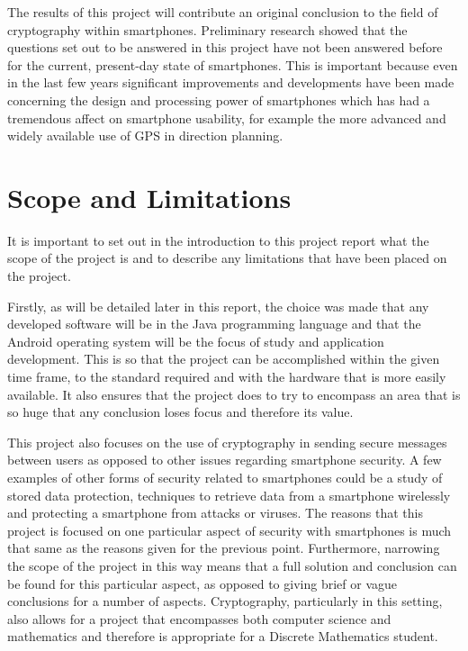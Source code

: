 \documentclass[a4paper,10pt]{report}
\begin{document}
The results of this project will contribute an original conclusion to the field of cryptography within smartphones. Preliminary research showed that the questions set out to be answered in this project have not been answered before for the current, present-day state of smartphones. This is important because even in the last few years significant improvements and developments have been made concerning the design and processing power of smartphones which has had a tremendous affect on smartphone usability, for example the more advanced and widely available use of GPS in direction planning. 

\section{Scope and Limitations}

It is important to set out in the introduction to this project report what the scope of the project is and to describe any limitations that have been placed on the project.

Firstly, as will be detailed later in this report, the choice was made that any developed software will be in the Java programming language and that the Android operating system will be the focus of study and application development. This is so that the project can be accomplished within the given time frame, to the standard required and with the hardware that is more easily available. It also ensures that the project does to try to encompass an area that is so huge that any conclusion loses focus and therefore its value.

This project also focuses on the use of cryptography in sending secure messages between users as opposed to other issues regarding smartphone security. A few examples of other forms of security related to smartphones could be a study of stored data protection, techniques to retrieve data from a smartphone wirelessly and protecting a smartphone from attacks or viruses. The reasons that this project is focused on one particular aspect of security with smartphones is much that same as the reasons given for the previous point. Furthermore, narrowing the scope of the project in this way means that a full solution and conclusion can be found for this particular aspect, as opposed to giving brief or vague conclusions for a number of aspects. Cryptography, particularly in this setting, also allows for a project that encompasses both computer science and mathematics and therefore is appropriate for a Discrete Mathematics student. 
\end{document}
